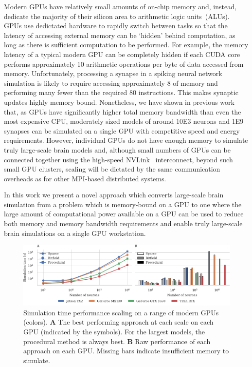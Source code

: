 \documentclass[9pt,twocolumn,twoside,lineno]{pnas-new}
\begin{document}
Modern GPUs have relatively small amounts of on-chip memory and, instead, dedicate the majority of their silicon area to arithmetic logic units~(ALUs).
GPUs use dedictated hardware to rapidly switch between tasks so that the latency of accessing external memory can be `hidden' behind computation, as long as there is sufficient computation to be performed.
For example, the memory latency of a typical modern GPU can be completely hidden if each CUDA core performs approximately 10 arithmetic operations per byte of data accessed from memory.
Unfortunately, processing a synapse in a spiking neural network simulation is likely to require accessing approximately \SI{8}{\byte} of memory and performing many fewer than the required 80 instructions. This makes synaptic updates highly memory bound.
Nonetheless, we have shown in previous work~\citep{Knight2018} that, as GPUs have significantly higher total memory bandwidth than even the most expensive CPU, moderately sized models of around \num{10E3} neurons and \num{1E9} synapses can be simulated on a single GPU with competitive speed and energy requirements.
However, individual GPUs do not have enough memory to simulate truly large-scale brain models and, although small numbers of GPUs can be connected together using the high-speed NVLink~\citep{NVIDIACorporation} interconnect, beyond such small GPU clusters, scaling will be dictated by the same communication overheads as for other MPI-based distributed systems.

In this work we present a novel approach which converts large-scale brain simulation from a problem which is memory-bound on a GPU to one where the large amount of computational power available on a GPU can be used to reduce both memory and memory bandwidth requirements and enable truly large-scale brain simulations on a single GPU workstation.

\begin{figure}
    \centering
    \includegraphics{figures/performance_scaling}
    \caption{Simulation time performance scaling on a range of modern GPUs (colors). \textbf{A} The best performing approach at each scale on each GPU (indicated by the symbols). For the largest models, the procedural method is always best.
    \textbf{B} Raw performance of each approach on each GPU.
    Missing bars indicate insufficient memory to simulate.}
    \label{fig:performance_scaling}
\end{figure}
\end{document}
